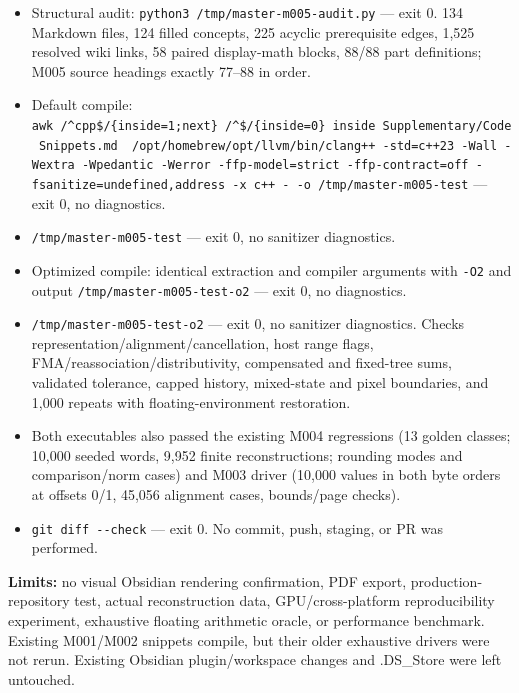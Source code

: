 \begin{itemize}
\tightlist
\item
  Structural audit: \texttt{python3\ /tmp/master-m005-audit.py} --- exit 0. 134 Markdown files, 124 filled concepts, 225 acyclic prerequisite edges, 1,525 resolved wiki links, 58 paired display-math blocks, 88/88 part definitions; M005 source headings exactly 77--88 in order.
\item
  Default compile: \texttt{awk\ \textquotesingle{}/\^{}\textasciigrave{}\textasciigrave{}\textasciigrave{}cpp\$/\{inside=1;next\}\ /\^{}\textasciigrave{}\textasciigrave{}\textasciigrave{}\$/\{inside=0\}\ inside\textquotesingle{}\ \textquotesingle{}Supplementary/Code\ Snippets.md\textquotesingle{}\ \textbar{}\ /opt/homebrew/opt/llvm/bin/clang++\ -std=c++23\ -Wall\ -Wextra\ -Wpedantic\ -Werror\ -ffp-model=strict\ -ffp-contract=off\ -fsanitize=undefined,address\ -x\ c++\ -\ -o\ /tmp/master-m005-test} --- exit 0, no diagnostics.
\item
  \texttt{/tmp/master-m005-test} --- exit 0, no sanitizer diagnostics.
\item
  Optimized compile: identical extraction and compiler arguments with \texttt{-O2} and output \texttt{/tmp/master-m005-test-o2} --- exit 0, no diagnostics.
\item
  \texttt{/tmp/master-m005-test-o2} --- exit 0, no sanitizer diagnostics. Checks representation/alignment/cancellation, host range flags, FMA/reassociation/distributivity, compensated and fixed-tree sums, validated tolerance, capped history, mixed-state and pixel boundaries, and 1,000 repeats with floating-environment restoration.
\item
  Both executables also passed the existing M004 regressions (13 golden classes; 10,000 seeded words, 9,952 finite reconstructions; rounding modes and comparison/norm cases) and M003 driver (10,000 values in both byte orders at offsets 0/1, 45,056 alignment cases, bounds/page checks).
\item
  \texttt{git\ diff\ -\/-check} --- exit 0. No commit, push, staging, or PR was performed.
\end{itemize}

\textbf{Limits:} no visual Obsidian rendering confirmation, PDF export, production-repository test, actual reconstruction data, GPU/cross-platform reproducibility experiment, exhaustive floating arithmetic oracle, or performance benchmark. Existing M001/M002 snippets compile, but their older exhaustive drivers were not rerun. Existing Obsidian plugin/workspace changes and .DS\_Store were left untouched.

